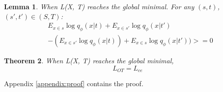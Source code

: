 \documentclass[11pt]{article}
\newtheorem{theorem}{Theorem}[section]
\newtheorem{lemma}[theorem]{Lemma}
\begin{document}
\begin{lemma} When L(X, T) reaches the global minimal. For any $(s, t)$, $(s', t') \in (S, T)$: 
\begin{equation}
\begin{aligned}
    &E_{x \in s} \log q_{\phi}(x|t) +  E_{x \in s'} \log q_{\phi}(x|t')  \\
    &- (E_{x \in s'} \log q_{\phi}(x|t)) + E_{x \in s} \log q_{\phi}(x|t')) >= 0
\end{aligned}
\label{eq20}
\end{equation}

\end{lemma}


\begin{theorem}


When L(X, T) reaches the global minimal, $$L_{OT} = L_{ce}  $$
\end{theorem}
Appendix \ref{appendix:proof} contains the proof. 
\end{document}

